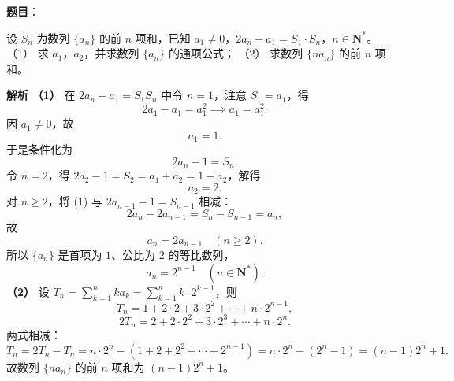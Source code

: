 \begin{answer}

\textbf{题目}：

设 $S_n$ 为数列 $\{a_n\}$ 的前 $n$ 项和，已知 $a_1\ne0$，$2a_n-a_1=S_1\cdot S_n$，$n\in\mathbf N^*$。
（1） 求 $a_1$，$a_2$，并求数列 $\{a_n\}$ 的通项公式；
（2） 求数列 $\{na_n\}$ 的前 $n$ 项和。

\textbf{解析}
\textbf{（1）} 在 $2a_n-a_1=S_1S_n$ 中令 $n=1$，注意 $S_1=a_1$，得
\nopagebreak[4]
\[2a_1-a_1=a_1^2\implies a_1=a_1^2.\]
因 $a_1\ne0$，故
\nopagebreak[4]
\[a_1=1.\]
于是条件化为
\nopagebreak[4]
\[2a_n-1=S_n. \tag{1}\]
令 $n=2$，得 $2a_2-1=S_2=a_1+a_2=1+a_2$，解得
\nopagebreak[4]
\[a_2=2.\]
对 $n\geqslant2$，将 (1) 与 $2a_{n-1}-1=S_{n-1}$ 相减：
\nopagebreak[4]
\[2a_n-2a_{n-1}=S_n-S_{n-1}=a_n,\]
故
\nopagebreak[4]
\[a_n=2a_{n-1}\quad(n\geqslant2).\]
所以 $\{a_n\}$ 是首项为 $1$、公比为 $2$ 的等比数列，
\nopagebreak[4]
\[a_n=2^{n-1}\quad(n\in\mathbf N^*).\]
\textbf{（2）} 设 $T_n=\displaystyle\sum_{k=1}^n ka_k=\sum_{k=1}^n k\cdot2^{k-1}$，则
\nopagebreak[4]
\[T_n=1+2\cdot2+3\cdot2^2+\cdots+n\cdot2^{n-1},\]
\nopagebreak[4]
\[2T_n=2+2\cdot2^2+3\cdot2^3+\cdots+n\cdot2^n.\]
两式相减：
\nopagebreak[4]
\[T_n=2T_n-T_n=n\cdot2^n-(1+2+2^2+\cdots+2^{n-1})=n\cdot2^n-(2^n-1)=(n-1)2^n+1.\]
故数列 $\{na_n\}$ 的前 $n$ 项和为 $(n-1)2^n+1$。



\end{answer}

